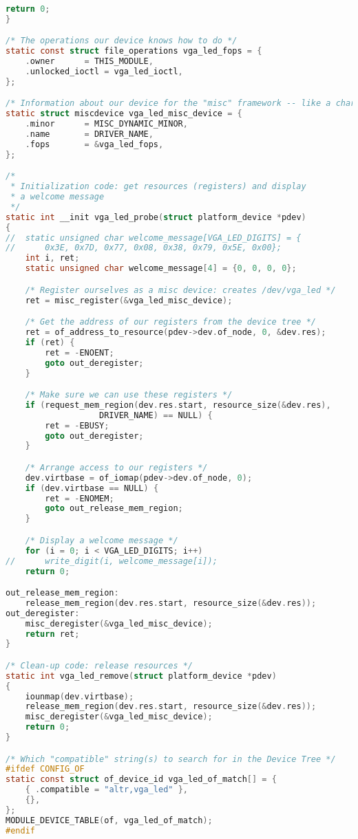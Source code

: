 \documentclass[twoside,12pt,fleqn]{book} %
\begin{document}
\begin{lstlisting}[language=C]
	return 0;
}

/* The operations our device knows how to do */
static const struct file_operations vga_led_fops = {
	.owner		= THIS_MODULE,
	.unlocked_ioctl = vga_led_ioctl,
};

/* Information about our device for the "misc" framework -- like a char dev */
static struct miscdevice vga_led_misc_device = {
	.minor		= MISC_DYNAMIC_MINOR,
	.name		= DRIVER_NAME,
	.fops		= &vga_led_fops,
};

/*
 * Initialization code: get resources (registers) and display
 * a welcome message
 */
static int __init vga_led_probe(struct platform_device *pdev)
{
//	static unsigned char welcome_message[VGA_LED_DIGITS] = {
//		0x3E, 0x7D, 0x77, 0x08, 0x38, 0x79, 0x5E, 0x00};
	int i, ret;
	static unsigned char welcome_message[4] = {0, 0, 0, 0};

	/* Register ourselves as a misc device: creates /dev/vga_led */
	ret = misc_register(&vga_led_misc_device);

	/* Get the address of our registers from the device tree */
	ret = of_address_to_resource(pdev->dev.of_node, 0, &dev.res);
	if (ret) {
		ret = -ENOENT;
		goto out_deregister;
	}

	/* Make sure we can use these registers */
	if (request_mem_region(dev.res.start, resource_size(&dev.res),
			       DRIVER_NAME) == NULL) {
		ret = -EBUSY;
		goto out_deregister;
	}

	/* Arrange access to our registers */
	dev.virtbase = of_iomap(pdev->dev.of_node, 0);
    if (dev.virtbase == NULL) {
		ret = -ENOMEM;
		goto out_release_mem_region;
	}

	/* Display a welcome message */
	for (i = 0; i < VGA_LED_DIGITS; i++)		
//		write_digit(i, welcome_message[i]);
	return 0;

out_release_mem_region:
	release_mem_region(dev.res.start, resource_size(&dev.res));
out_deregister:
	misc_deregister(&vga_led_misc_device);
	return ret;
}

/* Clean-up code: release resources */
static int vga_led_remove(struct platform_device *pdev)
{
	iounmap(dev.virtbase);
	release_mem_region(dev.res.start, resource_size(&dev.res));
	misc_deregister(&vga_led_misc_device);
	return 0;
}

/* Which "compatible" string(s) to search for in the Device Tree */
#ifdef CONFIG_OF
static const struct of_device_id vga_led_of_match[] = {
	{ .compatible = "altr,vga_led" },
	{},
};
MODULE_DEVICE_TABLE(of, vga_led_of_match);
#endif


\end{lstlisting}
\end{document}
